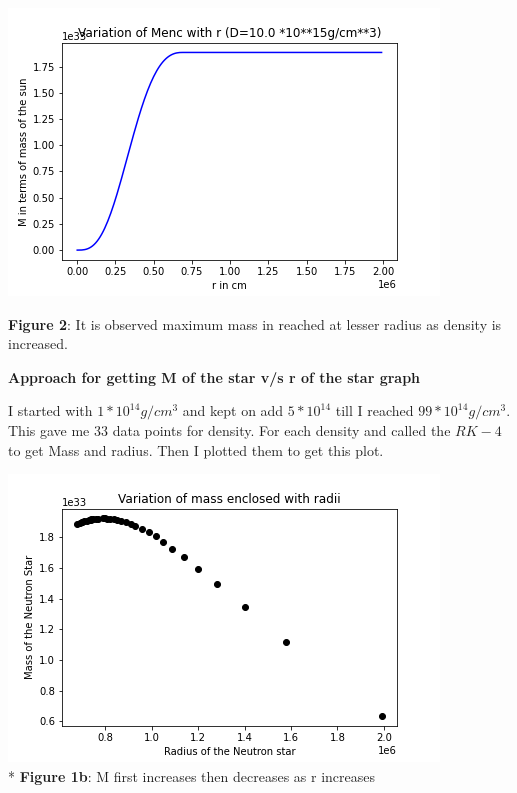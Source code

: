 \documentclass{article}
\begin{document}
\begin{center}
\begin{multicols}{2}
\begin{center}
        \end{center}
\columnbreak
	\begin{center}
       \includegraphics[scale=0.4]{Images/Mr_pb2_4}
       \end{center}
\end{multicols}
\textbf{Figure 2}: It is observed maximum mass in reached at lesser radius as density is increased.
\end{center}
\vspace{0.2em}

 \clearpage
\textbf{Approach for getting M of the star v/s r of the star graph}

I started with $1*10^{14}g/cm^{3}$ and kept on add $5*10^{14}$ till I reached $99*10^{14}g/cm^{3}$. This gave me 33 data points for density. For each density and called the $RK-4$ to get Mass and radius. Then I plotted them to get this plot.

\begin{center}
\includegraphics[scale=0.5]{Images/Mr_pb2h}
\\*
\textbf{Figure 1b}: M first increases then decreases as r increases
\end{center}
\end{document}
